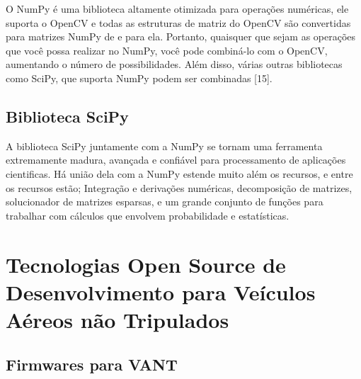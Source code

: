 O NumPy é uma biblioteca altamente otimizada para operações numéricas, ele suporta o OpenCV e todas as estruturas de matriz do OpenCV são convertidas para matrizes NumPy de e para ela. Portanto, quaisquer que sejam as operações que você possa realizar no NumPy, você pode combiná-lo com o OpenCV, aumentando o número de possibilidades. Além disso, várias outras bibliotecas como SciPy, que suporta NumPy podem ser combinadas [15]. 

\subsection{Biblioteca SciPy}
A biblioteca SciPy juntamente com a NumPy se tornam uma ferramenta extremamente madura, avançada e confiável para processamento de aplicações cientificas. Há união dela com a NumPy estende muito além os recursos, e entre os recursos estão; Integração e derivações numéricas, decomposição de matrizes, solucionador de matrizes esparsas, e um grande conjunto de funções para trabalhar com cálculos que envolvem probabilidade e estatísticas. 

%	
%

\section{Tecnologias Open Source de Desenvolvimento para Veículos Aéreos não Tripulados}

\subsection{Firmwares para VANT}

